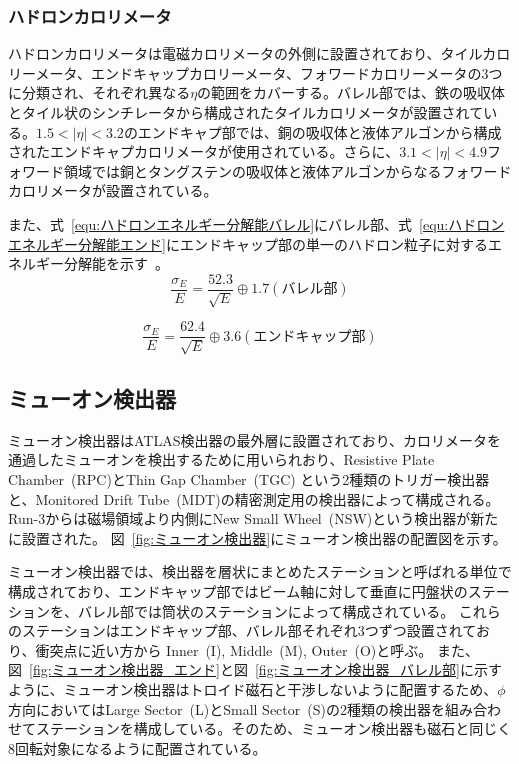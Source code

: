 \subsubsection{ハドロンカロリメータ}
ハドロンカロリメータは電磁カロリメータの外側に設置されており、タイルカロリーメータ、エンドキャップカロリーメータ、フォワードカロリーメータの3つに分類され、それぞれ異なる$\eta$の範囲をカバーする。バレル部では、鉄の吸収体とタイル状のシンチレータから構成されたタイルカロリメータが設置されている。$1.5 < |\eta| < 3.2$のエンドキャプ部では、銅の吸収体と液体アルゴンから構成されたエンドキャプカロリメータが使用されている。さらに、$3.1 < |\eta| < 4.9$フォワード領域では銅とタングステンの吸収体と液体アルゴンからなるフォワードカロリメータが設置されている。

また、式~\eqref{equ:ハドロンエネルギー分解能バレル}にバレル部、式~\eqref{equ:ハドロンエネルギー分解能エンド}にエンドキャップ部の単一のハドロン粒子に対するエネルギー分解能を示す~\cite{Aad:1129811}。
\begin{equation}
    \frac{\sigma_{E}}{E} = \frac{52.3}{\sqrt{E}}\oplus 1.7　(バレル部)
　\label{equ:ハドロンエネルギー分解能バレル}
\end{equation}

\begin{equation}
    \frac{\sigma_{E}}{E} = \frac{62.4}{\sqrt{E}}\oplus 3.6　(エンドキャップ部)
　\label{equ:ハドロンエネルギー分解能エンド}
\end{equation}

\subsection{ミューオン検出器}\label{section2-2-4}
ミューオン検出器はATLAS検出器の最外層に設置されており、カロリメータを通過したミューオンを検出するために用いられおり、Resistive Plate Chamber~(RPC)とThin Gap Chamber~(TGC) という2種類のトリガー検出器と、Monitored Drift Tube~(MDT)の精密測定用の検出器によって構成される。Run-3からは磁場領域より内側にNew Small Wheel~(NSW)という検出器が新たに設置された。
図~\ref{fig:ミューオン検出器}にミューオン検出器の配置図を示す。

ミューオン検出器では、検出器を層状にまとめたステーションと呼ばれる単位で構成されており、エンドキャップ部ではビーム軸に対して垂直に円盤状のステーションを、バレル部では筒状のステーションによって構成されている。
これらのステーションはエンドキャップ部、バレル部それぞれ3つずつ設置されており、衝突点に近い方から Inner~(I), Middle~(M), Outer~(O)と呼ぶ。
また、図~\ref{fig:ミューオン検出器_エンド}と図~\ref{fig:ミューオン検出器_バレル部}に示すように、ミューオン検出器はトロイド磁石と干渉しないように配置するため、$\phi$方向においてはLarge Sector~(L)とSmall Sector~(S)の2種類の検出器を組み合わせてステーションを構成している。そのため、ミューオン検出器も磁石と同じく8回転対象になるように配置されている。


